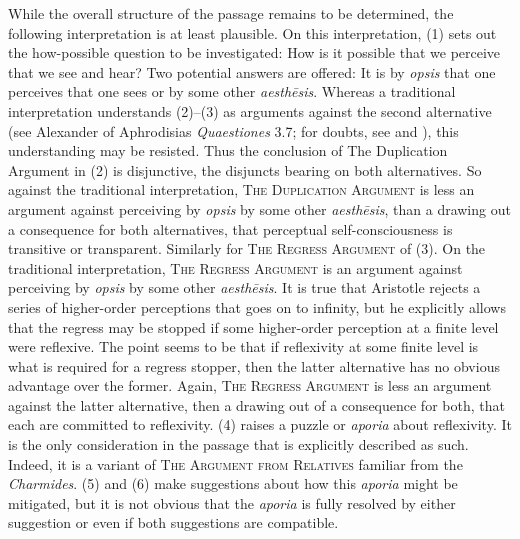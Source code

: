 

While the overall structure of the passage remains to be determined, the following interpretation is at least plausible. On this interpretation, (1) sets out the how-possible question to be investigated: How is it possible that we perceive that we see and hear? Two potential answers are offered: It is by \emph{opsis} that one perceives that one sees or by some other \emph{aesthēsis}. Whereas a traditional interpretation understands (2)–(3) as arguments against the second alternative (see Alexander of Aphrodisias \emph{Quaestiones} 3.7; for doubts, see \citealt{Kosman:2014ab} and \citealt{Osborne:1983le}), this understanding may be resisted. Thus the conclusion of The Duplication Argument in (2) is disjunctive, the disjuncts bearing on both alternatives. So against the traditional interpretation, \textsc{The Duplication Argument} is less an argument against perceiving by \emph{opsis} by some other \emph{aesthēsis}, than a drawing out a consequence for both alternatives, that perceptual self-consciousness is transitive or transparent. Similarly for \textsc{The Regress Argument} of (3). On the traditional interpretation, \textsc{The Regress Argument} is an argument against perceiving by \emph{opsis} by some other \emph{aesthēsis}. It is true that Aristotle rejects a series of higher-order perceptions that goes on to infinity, but he explicitly allows that the regress may be stopped if some higher-order perception at a finite level were reflexive. The point seems to be that if reflexivity at some finite level is what is required for a regress stopper, then the latter alternative has no obvious advantage over the former. Again, \textsc{The Regress Argument} is less an argument against the latter alternative, then a drawing out of a consequence for both, that each are committed to reflexivity. (4) raises a puzzle or \emph{aporia} about reflexivity. It is the only consideration in the passage that is explicitly described as such. Indeed, it is a variant of \textsc{The Argument from Relatives} familiar from the \emph{Charmides}. (5) and (6) make suggestions about how this \emph{aporia} might be mitigated, but it is not obvious that the \emph{aporia} is fully resolved by either suggestion or even if both suggestions are compatible.

